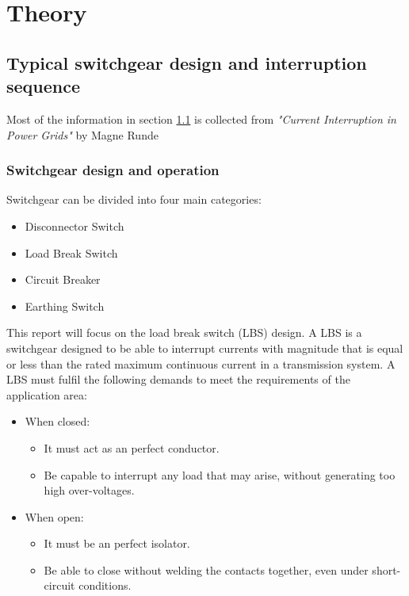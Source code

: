 \documentclass[10pt,a4paper]{article}
\begin{document}

\newpage

\section{Theory}
\subsection{Typical switchgear design and interruption sequence} \label{sec:genDes}
Most of the information in section \ref{sec:genDes} is collected from \textit{"Current Interruption in Power Grids"} by Magne Runde \cite{bib:HVEbreak} \newline

\subsubsection{Switchgear design and operation} \label{sec:InterruptCurrent}
Switchgear can be divided into four main categories:
\begin{itemize}
\item Disconnector Switch
\item Load Break Switch
\item Circuit Breaker
\item Earthing Switch
\end{itemize}
This report will focus on the load break switch (LBS) design. A LBS is a switchgear designed to be able to interrupt currents with magnitude that is equal or less than the rated maximum continuous current in a transmission system. A LBS must fulfil the following demands to meet the requirements of the application area:

\begin{itemize}
\item When closed:
	\begin{itemize}
		\item It must act as an perfect conductor.
		\item Be capable to interrupt any load that may arise, without generating too high over-voltages. 
	\end{itemize}
\item When open:
	\begin{itemize}
		\item It must be an perfect isolator.
		\item Be able to close without welding the contacts together, even under short-circuit conditions.
	\end{itemize}
\end{itemize}
\end{document}
